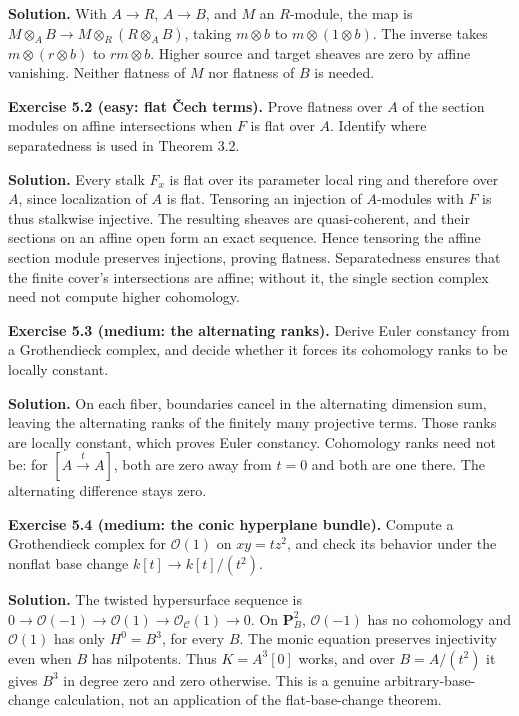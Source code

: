 \documentclass[11pt]{article}
\begin{document}
\textbf{Solution.} With \(A\to R\), \(A\to B\), and \(M\) an
\(R\)-module, the map is \(M\otimes_A B\to M\otimes_R(R\otimes_A B)\),
taking \(m\otimes b\) to \(m\otimes(1\otimes b)\). The inverse takes
\(m\otimes(r\otimes b)\) to \(rm\otimes b\). Higher source and target
sheaves are zero by affine vanishing. Neither flatness of \(M\) nor
flatness of \(B\) is needed.

\textbf{Exercise 5.2 (easy: flat Čech terms).} Prove flatness over \(A\)
of the section modules on affine intersections when \(F\) is flat over
\(A\). Identify where separatedness is used in Theorem 3.2.

\textbf{Solution.} Every stalk \(F_x\) is flat over its parameter local
ring and therefore over \(A\), since localization of \(A\) is flat.
Tensoring an injection of \(A\)-modules with \(F\) is thus stalkwise
injective. The resulting sheaves are quasi-coherent, and their sections
on an affine open form an exact sequence. Hence tensoring the affine
section module preserves injections, proving flatness. Separatedness
ensures that the finite cover's intersections are affine; without it,
the single section complex need not compute higher cohomology.

\textbf{Exercise 5.3 (medium: the alternating ranks).} Derive Euler
constancy from a Grothendieck complex, and decide whether it forces its
cohomology ranks to be locally constant.

\textbf{Solution.} On each fiber, boundaries cancel in the alternating
dimension sum, leaving the alternating ranks of the finitely many
projective terms. Those ranks are locally constant, which proves Euler
constancy. Cohomology ranks need not be: for \([A\xrightarrow{t}A]\),
both are zero away from \(t=0\) and both are one there. The alternating
difference stays zero.

\textbf{Exercise 5.4 (medium: the conic hyperplane bundle).} Compute a
Grothendieck complex for \(\mathcal O(1)\) on \(xy=tz^2\), and check its
behavior under the nonflat base change \(k[t]\to k[t]/(t^2)\).

\textbf{Solution.} The twisted hypersurface sequence is
\(0\to\mathcal O(-1)\to\mathcal O(1)\to\mathcal O_{\mathcal C}(1)\to0\).
On \(\mathbf P^2_B\), \(\mathcal O(-1)\) has no cohomology and
\(\mathcal O(1)\) has only \(H^0=B^3\), for every \(B\). The monic
equation preserves injectivity even when \(B\) has nilpotents. Thus
\(K=A^3[0]\) works, and over \(B=A/(t^2)\) it gives \(B^3\) in degree
zero and zero otherwise. This is a genuine arbitrary-base-change
calculation, not an application of the flat-base-change theorem.
\end{document}
